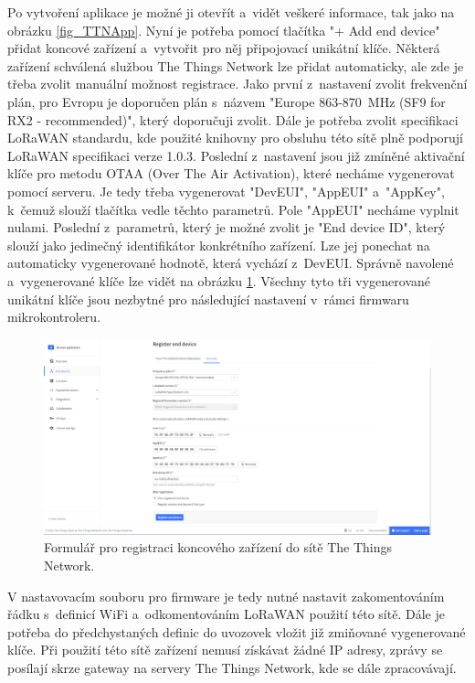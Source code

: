 Po vytvoření aplikace je možné ji otevřít a~vidět veškeré informace, tak jako na obrázku \ref{fig_TTNApp}. Nyní je potřeba pomocí tlačítka "+ Add end device"{} přidat koncové zařízení a~vytvořit pro něj připojovací unikátní klíče. Některá zařízení schválená službou The Things Network lze přidat automaticky, ale zde je třeba zvolit manuální možnost registrace. Jako první z~nastavení zvolit frekvenční plán, pro Evropu je doporučen plán s~názvem "Europe 863-870~MHz (SF9 for RX2 - recommended)", který doporučuji zvolit. Dále je potřeba zvolit specifikaci LoRaWAN standardu, kde použité knihovny pro obsluhu této sítě plně podporují LoRaWAN specifikaci verze 1.0.3. Poslední z~nastavení jsou již zmíněné aktivační klíče pro metodu OTAA (Over The Air Activation), které necháme vygenerovat pomocí serveru. Je tedy třeba vygenerovat "DevEUI", "AppEUI"{} a~"AppKey", k~čemuž slouží tlačítka vedle těchto parametrů. Pole "AppEUI"{} necháme vyplnit nulami. Poslední z~parametrů, který je možné zvolit je "End device ID", který slouží jako jedinečný identifikátor konkrétního zařízení. Lze jej ponechat na automaticky vygenerované hodnotě, která vychází z~DevEUI. Správně navolené a~vygenerované klíče lze vidět na obrázku \ref{fig_TTNDeviceGeneration}. Všechny tyto tři vygenerované unikátní klíče jsou nezbytné pro následující nastavení v~rámci firmwaru mikrokontroleru.

\begin{figure}[h]
    \centering
    \includegraphics[width=\textwidth]{obrazky/ttnDeviceRegister.png}
    \caption{Formulář pro registraci koncového zařízení do sítě The Things Network.}
    \label{fig_TTNDeviceGeneration}
\end{figure}

V nastavovacím souboru pro firmware je tedy nutné nastavit zakomentováním řádku s~definicí WiFi a~odkomentováním LoRaWAN použití této sítě. Dále je potřeba do předchystaných definic do uvozovek vložit již zmiňované vygenerované klíče. Při použití této sítě zařízení nemusí získávat žádné IP adresy, zprávy se posílají skrze gateway na servery The Things Network, kde se dále zpracovávají.

